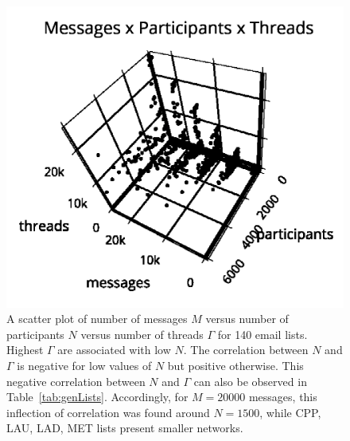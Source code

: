 \documentclass[%
	aip,
	jmp,%
	amsmath,amssymb,
	reprint,%
]{revtex4-1}
\begin{document}
																																																																																					\begin{figure}
																																																																																						\centering
																																																																																						\includegraphics[trim={0 0 0 1cm},clip,width=.7\columnwidth]{figs/mpgamma2}
																																																																																						\caption{A scatter plot of number of messages $M$ versus number of participants $N$ versus number of threads $\Gamma$ for 140 email lists.
																																																																																							Highest $\Gamma$ are associated with low $N$.
																																																																																							The correlation between $N$ and $\Gamma$ is negative for low values of $N$ but positive otherwise.
																																																																																							This negative correlation between $N$ and $\Gamma$ can also be observed in Table~\ref{tab:genLists}.
																																																																																							Accordingly, for $M=20000$ messages, this inflection
																																																																																							of correlation was found around $N=1500$, while CPP, LAU, LAD, MET lists 
																																																																																						present smaller networks.}
																																																																																						\label{fig:nmgamma3d}
																																																																																					\end{figure}
\end{document}
